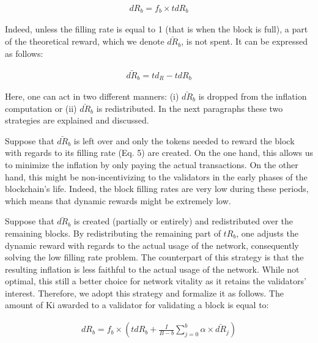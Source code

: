 \documentclass[conference]{IEEEtran}
\begin{document}
\begin{ceqn}
	\begin{align}
		dR_b=f_b \times tdR_b
	\end{align}
\end{ceqn}

Indeed, unless the filling rate is equal to 1 (that is when the block is full), a part of the theoretical reward, which we denote $\bar{dR}_b$, is not spent. It can be expressed as follows:
\begin{ceqn}
	\begin{align}
		\bar{dR}_b=td_R - tdR_b
	\end{align}
\end{ceqn}

Here, one can act in two different manners: (i) $\bar{dR}_b$ is dropped from the inflation computation or (ii) $\bar{dR}_b$ is redistributed. In the next paragraphs these two strategies are explained and discussed.

Suppose that $\bar{dR}_b$ is left over and only the tokens needed to reward the block with regards to its filling rate (Eq. 5) are created. On the one hand, this allows us to minimize the inflation by only paying the actual transactions. On the other hand, this might be non-incentivizing to the validators in the early phases of the blockchain's life. Indeed, the block filling rates are very low during these periods, which means that dynamic rewards might be extremely low.

Suppose that $\bar{dR}_b$ is created (partially or entirely) and redistributed over the remaining blocks. By redistributing the remaining part of $tR_b$, one adjusts the dynamic reward with regards to the actual usage of the network, consequently solving the low filling rate problem. The counterpart of this strategy is that the resulting inflation is less faithful to the actual usage of the network. While not optimal, this still a better choice for network vitality as it retains the validators' interest. Therefore, we adopt this strategy and formalize it as follows. The amount of Ki awarded to a validator for validating a block is equal to:

\begin{ceqn}
	\begin{align}
		dR_b=f_b  \times ( tdR_b + \frac{I}{B-b} \sum_{j=0}^{b} \alpha \times \bar{dR}_j)
	\end{align}
\end{ceqn}
\end{document}
